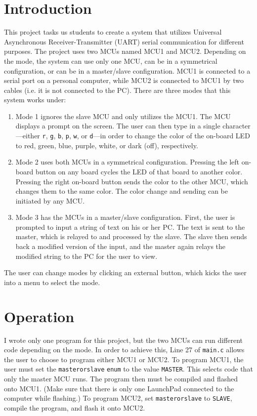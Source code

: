 \documentclass{article}
\renewcommand{\c}[1]{\texttt{#1}}
\begin{document}
\section{Introduction}
This project tasks us students to create a system that utilizes
Universal Asynchronous Receiver-Transmitter (UART) serial
communication for different purposes. The project uses two
MCUs named MCU1 and MCU2. Depending on the mode,
the system can use only one MCU, can be in a symmetrical
configuration, or can be in a master/slave configuration.
MCU1 is connected to a serial port
on a personal computer, while MCU2 is connected to MCU1 by two
cables (i.e. it is not connected to the PC). There are three
modes that this system works under:
\begin{enumerate}
	\item Mode 1 ignores the slave MCU and only utilizes the 
	MCU1. The MCU displays a prompt on the screen.
	The user can then type in a single character---either \c{r},
	\c{g}, \c{b}, \c{p}, \c{w}, or \c{d}---in order to
	change the color of the on-board LED to red, green, blue,
	purple, white, or dark (off), respectively.
	\item Mode 2 uses both MCUs in a symmetrical configuration.
	Pressing the left on-board button on any board cycles the
	LED of that board to another color. Pressing the right
	on-board button sends the color to the other MCU, which
	changes them to the same color. The color change and sending
	can be initiated by any MCU.
	\item Mode 3 has the MCUs in a master/slave configuration.
	First, the user is prompted to input a string of text on
	his or her PC. The text is sent to the master, which is
	relayed to and processed by the slave.
	The slave then sends back a modified
	version of the input, and the master again relays the
	modified string to the PC for the user to view.
\end{enumerate}

The user can change modes by clicking an external button, which
kicks the user into a menu to select the mode.

\section{Operation}
I wrote only one program for this project, but the two MCUs can
run different code depending on the mode. In order to
achieve this, Line 27 of \c{main.c} allows the user to choose
to program either MCU1 or MCU2. To program MCU1, the user must
set the \c{masterorslave} \c{enum} to the value \c{MASTER}.
This selects code that only the master MCU runs. The program
then must be compiled and flashed onto MCU1. (Make sure that
there is only one LaunchPad connected to the computer while
flashing.) To program MCU2,
set \c{masterorslave} to \c{SLAVE}, compile the program, and
flash it onto MCU2.
\end{document}
